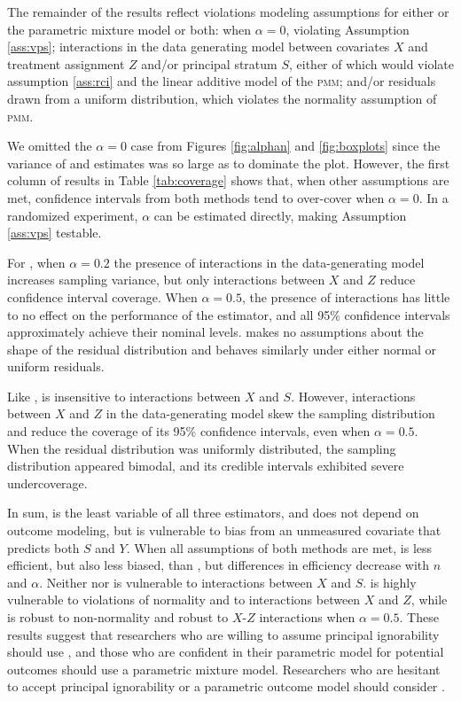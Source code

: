 \documentclass[]{article}
\begin{document}
The remainder of the results reflect violations modeling assumptions for either \geepers or the parametric mixture model or both: when $\alpha=0$, violating Assumption \ref{ass:vps}; interactions in the data generating model between covariates $X$ and treatment assignment $Z$ and/or principal stratum $S$, either of which would violate assumption \ref{ass:rci} and the linear additive model of the \textsc{pmm}; and/or residuals drawn from a uniform distribution, which violates the normality assumption of \textsc{pmm}.

We omitted the $\alpha=0$ case from Figures \ref{fig:alphan} and \ref{fig:boxplots} since the variance of \geepers and \pmm estimates was so large as to dominate the plot. 
However, the first column of results in Table \ref{tab:coverage} shows that, when other assumptions are met, confidence intervals from both methods tend to over-cover when $\alpha=0$. 
In a randomized experiment, $\alpha$ can be estimated directly, making Assumption \ref{ass:vps} testable.

For \geepers, when $\alpha=0.2$ the presence of interactions in the data-generating model increases sampling variance, but only interactions between $X$ and $Z$ reduce confidence interval coverage. When $\alpha=0.5$, the presence of interactions has little to no effect on the performance of the \geepers estimator, and all 95\% confidence intervals approximately achieve their nominal levels. \geepers makes no assumptions about the shape of the residual distribution and behaves similarly under either normal or uniform residuals.

Like \geepers, \pmm is insensitive to interactions between $X$ and $S$. However, interactions between $X$ and $Z$ in the data-generating model skew the \pmm sampling distribution and reduce the coverage of its 95\% confidence intervals, even when $\alpha=0.5$.
When the residual distribution was uniformly distributed, the \pmm sampling distribution appeared bimodal, and its credible intervals exhibited severe undercoverage.

\label{simsum}In sum, \psw is the least variable of all three estimators, and does not depend on outcome modeling, but is vulnerable to bias from an unmeasured covariate that predicts both $S$ and $Y$.
When all assumptions of both methods are met, \geepers is less efficient, but also less biased, than \pmm, but differences in efficiency decrease with $n$ and $\alpha$.
Neither \psw nor \pmm is vulnerable to interactions between $X$ and $S$.
\pmm is highly vulnerable to violations of normality and to interactions between $X$ and $Z$, while \psw is robust to non-normality and robust to $X$-$Z$ interactions when $\alpha = 0.5$.
These results suggest that researchers who are willing to assume principal ignorability should use \psw, and those who are confident in their parametric model for potential outcomes should use a parametric mixture model. Researchers who are hesitant to accept principal ignorability or a parametric outcome model should consider \geepers. 
\end{document}
